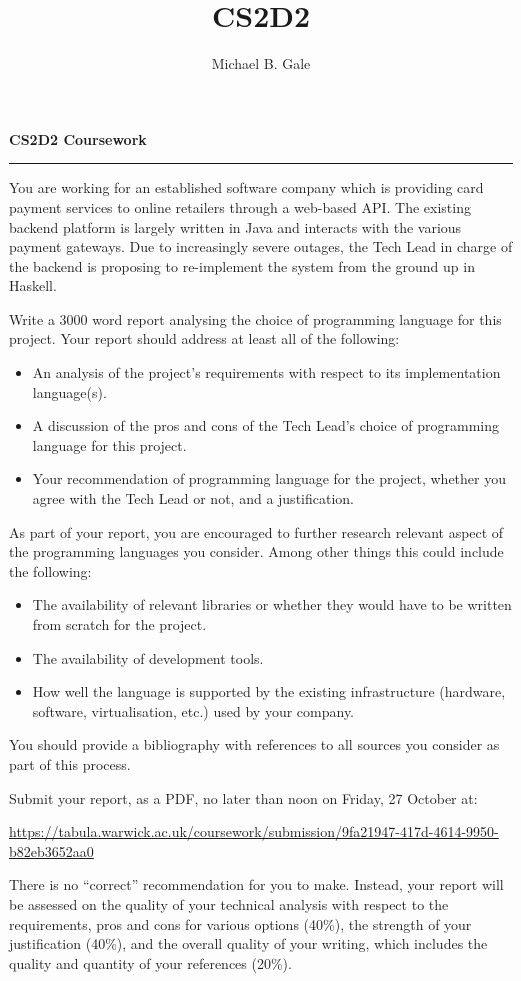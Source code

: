 \documentclass[]{uow-exercises}
\author{Michael B. Gale}
\title{CS2D2}
\begin{document}
\pagestyle{fancy}
\thispagestyle{fancy}

\begin{center}
    \textbf{\LARGE CS2D2 Coursework}
\end{center} \hrule \vspace{0.5cm}

You are working for an established software company which is providing card payment services to online retailers through a web-based API. The existing backend platform is largely written in Java and interacts with the various payment gateways. Due to increasingly severe outages, the Tech Lead in charge of the backend is proposing to re-implement the system from the ground up in Haskell.

Write a 3000 word report analysing the choice of programming language for this project. Your report should address at least all of the following:
\begin{itemize}
    \item An analysis of the project's requirements with respect to its implementation language(s).
    \item A discussion of the pros and cons of the Tech Lead's choice of programming language for this project.
    \item Your recommendation of programming language for the project, whether you agree with the Tech Lead or not, and a justification.
\end{itemize}
As part of your report, you are encouraged to further research relevant aspect of the programming languages you consider. Among other things this could include the following:
\begin{itemize}
    \item The availability of relevant libraries or whether they would have to be written from scratch for the project. 
    \item The availability of development tools.
    \item How well the language is supported by the existing infrastructure (hardware, software, virtualisation, etc.) used by your company.
\end{itemize}
You should provide a bibliography with references to all sources you consider as part of this process.

Submit your report, as a PDF, no later than noon on Friday, 27 October at:
\begin{center}
    \url{https://tabula.warwick.ac.uk/coursework/submission/9fa21947-417d-4614-9950-b82eb3652aa0}
\end{center}
There is no ``correct'' recommendation for you to make. Instead, your report will be assessed on the quality of your technical analysis with respect to the requirements, pros and cons for various options (40\%), the strength of your justification (40\%), and the overall quality of your writing, which includes the quality and quantity of your references (20\%). 

	
\end{document}
